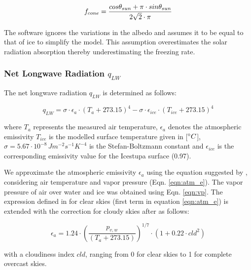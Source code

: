 \documentclass[utf8]{frontiersSCNS}
\begin{document}
\begin{equation}
	\begin{split}
		f_{cone}& =\frac{ cos \theta_{sun} + \pi \cdot sin \theta_{sun} }{2\sqrt{2} \cdot \pi }\\
	\end{split}
	\label{ eqn:f_{cone} }
\end{equation}

The software ignores the variations in the albedo and assumes it to be equal to that of ice to simplify the
model. This assumption overestimates the solar radiation absorption thereby underestimating the freezing rate.

\subsubsection{Net Longwave Radiation \texorpdfstring{$q_{LW}$}{Lg}} \label{sec:LW}

The net longwave radiation $q_{LW}$ is determined as follows:

\begin{equation}
	q_{LW}= \sigma \cdot \epsilon_a \cdot {(T_a+ 273.15)}^4 -\sigma \cdot \epsilon_{ice} \cdot {(T_{ice}+ 273.15)}^4
	\label{eqn:LW}
\end{equation}

where $T_a$ represents the measured air temperature, $\epsilon_a$ denotes the atmospheric emissivity $T_{ice}$
is the modelled surface temperature given in [$\degree C$], $\sigma=5.67\cdot10^{-8}\,Jm^{-2}s^{-1}K^{-4}$ is
the Stefan-Boltzmann constant and $\epsilon_{ice}$ is the corresponding emissivity value for the Icestupa
surface (0.97).

We approximate the atmospheric emissivity $\epsilon_a$ using the equation suggested by \cite{Brutsaert_1975},
considering air temperature and vapor pressure (Eqn. \ref{eqn:atm_e}). The vapor pressure of air over water and
ice was obtained using Eqn. \ref{eqn:vp}.  The expression defined in \cite{Brutsaert_1975} for clear skies
(first term in equation \ref{eqn:atm_e}) is extended with the correction for cloudy skies after
\cite{Brutsaert_1982} as follows:

\begin{equation}
	\epsilon_a=1.24 \cdot (\frac{p_{v,w}}{(T_a+273.15)})^{1/7}\cdot(1+0.22\cdot{cld}^2) \label{eqn:atm_e}
\end{equation}

with a cloudiness index $cld$, ranging from 0 for clear skies to 1 for complete overcast skies. 
\end{document}
